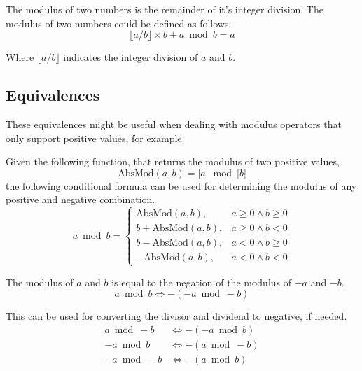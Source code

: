 \documentclass{article}
\begin{document}
The modulus of two numbers is the remainder of it's integer division. The
modulus of two numbers could be defined as follows.
\begin{equation*}
  \lfloor a / b \rfloor \times b + a \bmod b = a
\end{equation*}

Where $\lfloor a / b \rfloor$ indicates the integer division of $a$ and $b$.

\subsection{Equivalences}

These equivalences might be useful when dealing with modulus operators that only
support positive values, for example.

\bigskip

Given the following function, that returns the modulus of two positive values,
\begin{equation*}
  \text{AbsMod}(a, b) = |a| \bmod |b|
\end{equation*}
the following conditional formula can be used for determining the modulus of any
positive and negative combination.
\begin{equation*}
  a \bmod b =
  \begin{cases}
    \text{AbsMod}(a, b),     & a \geq 0 \land b \geq 0 \\
    b + \text{AbsMod}(a, b), & a \geq 0 \land b < 0 \\
    b - \text{AbsMod}(a, b), & a < 0 \land b \geq 0 \\
    -\text{AbsMod}(a, b),    & a < 0 \land b < 0
  \end{cases}
\end{equation*}

\bigskip

The modulus of $a$ and $b$ is equal to the negation of the modulus of $-a$ and
$-b$.
\begin{equation*}
  a \bmod  b \iff - \left( -a \bmod -b \right)
\end{equation*}

This can be used for converting the divisor and dividend to negative, if needed.
\begin{align*}
  a  \bmod -b & \iff - \left( -a \bmod  b \right) \\
  -a \bmod  b & \iff - \left(  a \bmod -b \right) \\
  -a \bmod -b & \iff - \left(  a \bmod  b \right)
\end{align*}
\end{document}
